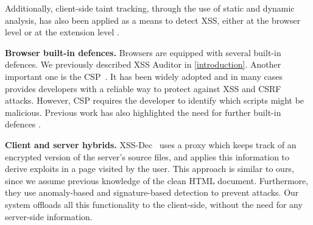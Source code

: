 Additionally, client-side taint tracking, through the use of static and dynamic analysis,
 has also been applied as a means to detect XSS, either
at the browser level or at the extension level \cite{8094406, 10.1007/978-3-642-04444-1_33}.

\textbf{Browser built-in defences.}  Browsers are equipped
with several built-in defences. We previously described XSS
Auditor in \autoref{introduction}. Another important one is the 
 \ac{CSP}~\cite{CSP}. It has been widely adopted and
in many cases provides developers with a reliable way to protect
against \ac{XSS} and \ac{CSRF} attacks. However, \ac{CSP} requires the developer to identify which scripts
might be malicious. Previous work has also highlighted the need for further built-in defences \cite{6825636}.

\textbf{Client and server hybrids.}
XSS-Dec~\cite{Sundareswaran:2012:XHS:2352970.2352994} uses a proxy which keeps track of an encrypted version of the server's source files, and applies this information to derive exploits in a page visited by the user. This approach is similar to ours, since we assume previous
knowledge of the clean HTML document. Furthermore, they use anomaly-based and signature-based detection to prevent attacks. Our system offloads all this functionality to the client-side, without the need for any server-side information.


